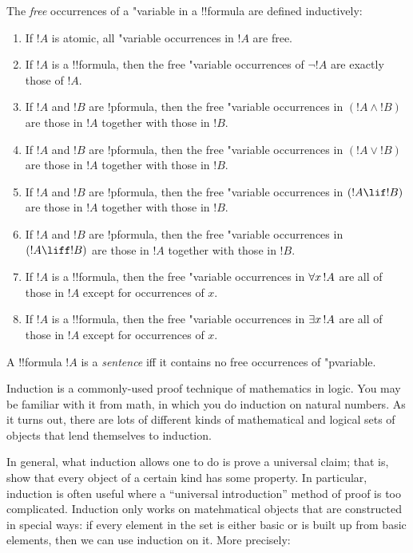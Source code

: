 \documentclass[../../include/open-logic-section]{subfiles}
\begin{document}


\begin{defn}
The \emph{free} occurrences of a "{variable} in a !!{formula} are defined
inductively:
\begin{enumerate}
\item If $!A$ is atomic, all "{variable} occurrences in $!A$ are free.
\item If $!A$ is a !!{formula}, then the free "{variable} occurrences of
  $\lnot !A$ are exactly those of $!A$.
\item If $!A$ and $!B$ are !p{formula}, then the free "{variable}
  occurrences in $(!A \land !B)$ are those in $!A$ together with those
  in $!B$.
\item If $!A$ and $!B$ are !p{formula}, then the free "{variable}
  occurrences in $(!A \lor !B)$ are those in $!A$ together with those
  in $!B$.
\item If $!A$ and $!B$ are !p{formula}, then the free "{variable}
  occurrences in $(!A \lif !B)$ are those in $!A$ together with those
  in $!B$.
\item If $!A$ and $!B$ are !p{formula}, then the free "{variable}
  occurrences in $(!A \liff !B)$ are those in $!A$ together with those
  in $!B$.
\item If $!A$ is a !!{formula}, then the free "{variable} occurrences in
  $\lforall[x][!A]$ are all of those in $!A$ except for occurrences of
  $x$.
\item If $!A$ is a !!{formula}, then the free "{variable} occurrences in
  $\lexists[x][!A]$ are all of those in $!A$ except for occurrences of
  $x$.
\end{enumerate}
\end{defn}

\begin{defn}[Sentence]
A !!{formula} $!A$ is a \emph{sentence} iff it contains no free
occurrences of "p{variable}.
\end{defn}

\begin{explain}
Induction is a commonly-used proof technique of mathematics in logic. 
You may be familiar with it from math, in which you do induction on 
natural numbers. As it turns out, there are lots of different kinds of 
mathematical and logical sets of objects that lend themselves to induction.

In general, what induction allows one to do is prove a universal claim; that 
is, show that every object of a certain kind has some property. In particular, 
induction is often useful where a ``universal introduction'' method of proof 
is too complicated. Induction only works on matehmatical objects that are 
constructed in special ways: if every element in the set is either basic or is 
built up from basic elements, then we can use induction on it. More precisely:
\end{explain}
\end{document}
